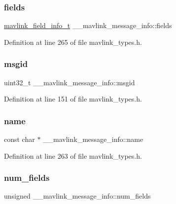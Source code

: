 \subsubsection{\texorpdfstring{fields}{fields}}
{\footnotesize\ttfamily \mbox{\hyperlink{include__v0_89_2mavlink__types_8h_a00291ed73cb08731cbcccb8dc974ac95}{mavlink\+\_\+field\+\_\+info\+\_\+t}} \+\_\+\+\_\+mavlink\+\_\+message\+\_\+info\+::fields}



Definition at line 265 of file mavlink\+\_\+types.\+h.

\mbox{\label{struct____mavlink__message__info_a4d2150d2bb5fdaa7da1231f3515d8cc4}} 
\subsubsection{\texorpdfstring{msgid}{msgid}}
{\footnotesize\ttfamily uint32\+\_\+t \+\_\+\+\_\+mavlink\+\_\+message\+\_\+info\+::msgid}



Definition at line 151 of file mavlink\+\_\+types.\+h.

\mbox{\label{struct____mavlink__message__info_a0fcc0c1558ed3da428104ba8ee136505}} 
\subsubsection{\texorpdfstring{name}{name}}
{\footnotesize\ttfamily const char $\ast$ \+\_\+\+\_\+mavlink\+\_\+message\+\_\+info\+::name}



Definition at line 263 of file mavlink\+\_\+types.\+h.

\mbox{\label{struct____mavlink__message__info_a0c343bcc1f27884e8c2ab875e7efc2e5}} 
\subsubsection{\texorpdfstring{num\_fields}{num\_fields}}
{\footnotesize\ttfamily unsigned \+\_\+\+\_\+mavlink\+\_\+message\+\_\+info\+::num\+\_\+fields}



